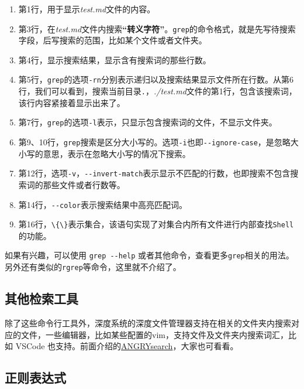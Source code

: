 \documentclass[doctor,openright,twoside]{sjtuthesis}
\providecommand{\tightlist}{%
    \setlength{\itemsep}{0pt}\setlength{\parskip}{0pt}}
\newcommand{\passthrough}[1]{#1}
\theoremstyle{plain}
\theoremstyle{definition}
\theoremstyle{remark}
\theoremstyle{ocrenumbox}
\theoremstyle{plain}
\begin{document}
\begin{enumerate}
\def\labelenumi{\arabic{enumi}.}
\tightlist
\item
  第1行，用于显示\emph{test.md}文件的内容。
\item
  第3行，在\emph{test.md}文件内搜索\textbf{``转义字符''}。\passthrough{\lstinline!grep!}的命令格式，就是先写待搜索字段，后写搜索的范围，比如某个文件或者文件夹。
\item
  第4行，显示搜索结果，显示含有搜索词的那些行数。
\item
  第5行，\passthrough{\lstinline!grep!}的选项\passthrough{\lstinline!-rn!}分别表示递归以及搜索结果显示文件所在行数。从第6行，我们可以看到，搜索当前目录\passthrough{\lstinline!.!}，\emph{./test.md}文件的第1行，包含该搜索词，该行内容紧接着显示出来了。
\item
  第7行，\passthrough{\lstinline!grep!}的选项\passthrough{\lstinline!-l!}表示，只显示包含搜索词的文件，不显示文件夹。
\item
  第9、10行，\passthrough{\lstinline!grep!}搜索是区分大小写的。选项\passthrough{\lstinline!-i!}也即\passthrough{\lstinline!--ignore-case!}，是忽略大小写的意思，表示在忽略大小写的情况下搜索。
\item
  第12行，选项\passthrough{\lstinline!-v!}，\passthrough{\lstinline!--invert-match!}表示显示不匹配的行数，也即搜索不包含搜索词的那些文件或者行数等。
\item
  第14行，\passthrough{\lstinline!--color!}表示搜索结果中高亮匹配词。
\item
  第16行，\passthrough{\lstinline!\{\}!}表示集合，该语句实现了对集合内所有文件进行内部查找\passthrough{\lstinline!Shell!}的功能。
\end{enumerate}

如果有兴趣，可以使用 \passthrough{\lstinline!grep --help!} 或者其他命令，查看更多\passthrough{\lstinline!grep!}相关的用法。另外还有类似的\passthrough{\lstinline!rgrep!}等命令，这里就不介绍了。

\hypertarget{section-83}{%
\subsection{其他检索工具}\label{section-83}}

除了这些命令行工具外，深度系统的深度文件管理器支持在相关的文件夹内搜索对应的文件，一些编辑器，比如某些配置的vim，支持文件及文件夹内搜索词汇，比如 VSCode 也支持。前面介绍的\href{https://github.com/DoTheEvo/ANGRYsearch}{ANGRYsearch}，大家也可看看。

\hypertarget{section-84}{%
\subsection{正则表达式}\label{section-84}}
\end{document}
